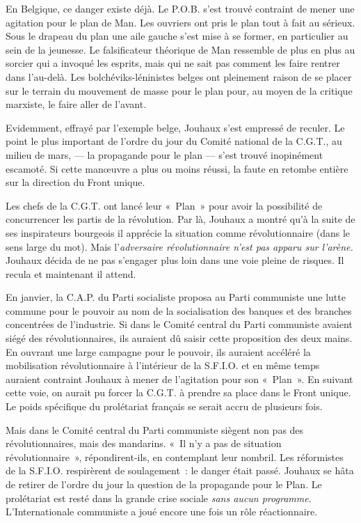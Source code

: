 \documentclass[french,twoside]{book} %
\begin{document}
En Belgique, ce danger existe déjà. Le P.O.B. s’est trouvé contraint de mener une agitation pour le plan de Man. Les ouvriers ont pris le plan tout à fait au sérieux. Sous le drapeau du plan une aile gauche s’est mise à se former, en particulier au sein de la jeunesse. Le falsificateur théorique de Man ressemble de plus en plus au sorcier qui a invoqué les esprits, mais qui ne sait pas comment les faire rentrer dans l’au-delà. Les bolchéviks-léninistes belges ont pleinement raison de se placer sur le terrain du mouvement de masse pour le plan pour, au moyen de la critique marxiste, le faire aller de l’avant.\par
Evidemment, effrayé par l’exemple belge, Jouhaux s’est empressé de reculer. Le point le plus important de l’ordre du jour du Comité national de la C.G.T., au milieu de mars, — la propagande pour le plan — s’est trouvé inopinément escamoté. Si cette manœuvre a plus ou moins réussi, la faute en retombe entière sur la direction du Front unique.\par
Les chefs de la C.G.T. ont lancé leur « Plan » pour avoir la possibilité de concurrencer les partis de la révolution. Par là, Jouhaux a montré qu’à la suite de ses inspirateurs bourgeois il apprécie la situation comme révolutionnaire (dans le sens large du mot). Mais l’\emph{adversaire révolutionnaire n’est pas apparu sur l’arène.} Jouhaux décida de ne pas s’engager plus loin dans une voie pleine de risques. Il recula et maintenant il attend.\par
En janvier, la C.A.P. du Parti socialiste proposa au Parti communiste une lutte commune pour le pouvoir au nom de la socialisation des banques et des branches concentrées de l’industrie. Si dans le Comité central du Parti communiste avaient siégé des révolutionnaires, ils auraient dû saisir cette proposition des deux mains. En ouvrant une  large campagne pour le pouvoir, ils auraient accéléré la mobilisation révolutionnaire à l’intérieur de la S.F.I.O. et en même temps auraient contraint Jouhaux à mener de l’agitation pour son « Plan ». En suivant cette voie, on aurait pu forcer la C.G.T. à prendre sa place dans le Front unique. Le poids spécifique du prolétariat français se serait accru de plusieurs fois.\par
Mais dans le Comité central du Parti communiste siègent non pas des révolutionnaires, mais des mandarins. « Il n’y a pas de situation révolutionnaire », répondirent-ils, en contemplant leur nombril. Les réformistes de la S.F.I.O. respirèrent de soulagement : le danger était passé. Jouhaux se hâta de retirer de l’ordre du jour la question de la propagande pour le Plan. Le prolétariat est resté dans la grande crise sociale \emph{sans aucun programme}. L’Internationale communiste a joué encore une fois un rôle réactionnaire.
\end{document}

